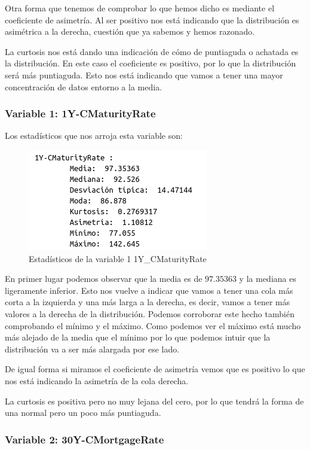 \documentclass[12pt,a4paper]{article}
\begin{document}
Otra forma que tenemos de comprobar lo que hemos dicho es mediante el coeficiente de asimetría. Al ser positivo nos está indicando que la distribución es asimétrica a la derecha, cuestión que ya sabemos y hemos razonado.

La curtosis nos está dando una indicación de cómo de puntiaguda o achatada es la distribución. En este caso el coeficiente es positivo, por lo que la distribución será más puntiaguda. Esto nos está indicando que vamos a tener una mayor concentración de datos entorno a la media.

\subsubsection*{Variable 1: 1Y-CMaturityRate}

Los estadísticos que nos arroja esta variable son:

\begin{figure}[H]
	\centering
	\includegraphics[scale=0.7]{./Imagenes/estadisticos_1Y_CMaturityRate.png}
	\caption{Estadísticos de la variable 1 1Y\_CMaturityRate}
\end{figure}

En primer lugar podemos observar que la media es de $97.35363$ y la mediana es ligeramente inferior. Esto nos vuelve a indicar que vamos a tener una cola más corta a la izquierda y una más larga a la derecha, es decir, vamos a tener más valores a la derecha de la distribución. Podemos corroborar este hecho también comprobando el mínimo y el máximo. Como podemos ver el máximo está mucho más alejado de la media que el mínimo por lo que podemos intuir que la distribución va a ser más alargada por ese lado.

De igual forma si miramos el coeficiente de asimetría vemos que es positivo lo que nos está indicando la asimetría de la cola derecha.

La curtosis es positiva pero no muy lejana del cero, por lo que tendrá la forma de una normal pero un poco más puntiaguda.

\subsubsection*{Variable 2: 30Y-CMortgageRate}
\end{document}
